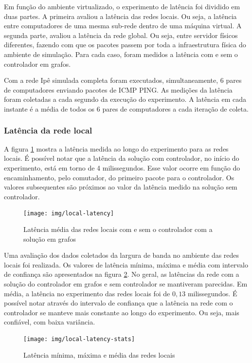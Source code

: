 Em função do ambiente virtualizado, o experimento de latência foi dividido em
duas partes.
A primeira avaliou a latência das redes locais.
Ou seja, a latência entre computadores de uma mesma sub-rede dentro de uma
máquina virtual.
A segunda parte, avaliou a latência da rede global.
Ou seja, entre servidor físicos diferentes, fazendo com que os pacotes
passem por toda a infraestrutura física do ambiente de simulação.
Para cada caso, foram medidos a latência com e sem o controlador em grafos.

Com a rede Ipê simulada completa foram executados, simultaneamente,
6 pares de computadores enviando pacotes de ICMP PING.
As medições da latência foram coletadas a cada segundo da execução do
experimento.
A latência em cada instante é a média de todos os 6 pares de computadores
a cada iteração de coleta.

\subsubsection{Latência da rede local}

A figura \ref{fig:local-latency} mostra a latência medida ao longo do
experimento para as redes locais.
É possível notar que a latência da solução com controlador, no início do
experimento, está em torno de 4 milissegundos.
Esse valor ocorre em função do encaminhamento, pelo comutador, do primeiro
pacote para o controlador.
Os valores subsequentes são próximos ao valor da latência medido na solução
sem controlador.

\begin{figure}[!htb]
    \centering
    \label{fig:local-latency}
    \texttt{[image: img/local-latency]}
    \caption{Latência média das redes locais com e sem o controlador com a
    solução em grafos}
\end{figure}

Uma avaliação dos dados coletados da largura de banda no ambiente das
redes locais foi realizada.
Os valores de latência mínima, máxima e média com intervalo de confiança
são apresentados na figura \ref{fig:local-latency-stats}.
No geral, as latências da rede com a solução do controlador em grafos e
sem controlador se mantiveram parecidas.
Em média, a latência no experimento das redes locais foi de
$0,13$ milissegundos.
É possível notar através do intervalo de confiança que a latência na rede
com o controlador se manteve mais constante ao longo do experimento.
Ou seja, mais confiável, com baixa variância.

\begin{figure}[!htb]
    \centering
    \label{fig:local-latency-stats}
    \texttt{[image: img/local-latency-stats]}
    \caption{Latência mínima, máxima e média das redes locais}
\end{figure}


